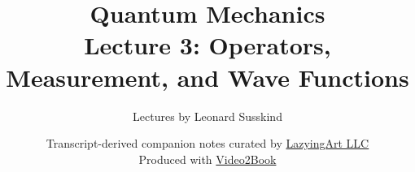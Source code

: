 \documentclass[11pt,oneside]{book}
\begin{document}
\hypersetup{pageanchor=false}
\frontmatter
\title{Quantum Mechanics\\[0.45em]
\large Lecture 3: Operators, Measurement, and Wave Functions}
\author{Lectures by Leonard Susskind}
\date{Transcript-derived companion notes curated by
\href{https://lazying.art}{LazyingArt LLC}\\[0.35em]
\small Produced with
\href{https://github.com/lachlanchen/Video2Book}{Video2Book}}
\maketitle
\hypersetup{pageanchor=true}
\mainmatter

\end{document}

